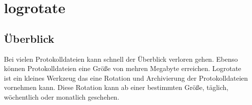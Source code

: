 \section{logrotate}
\subsection{Überblick}
Bei vielen Protokolldateien kann schnell der Überblick verloren gehen. Ebenso können Protokolldateien eine Größe von mehren Megabyte erreichen. Logrotate ist ein kleines Werkzeug das eine Rotation und Archivierung der Protokolldateien vornehmen kann. Diese Rotation kann ab einer bestimmten Größe, täglich, wöchentlich oder monatlich geschehen.
